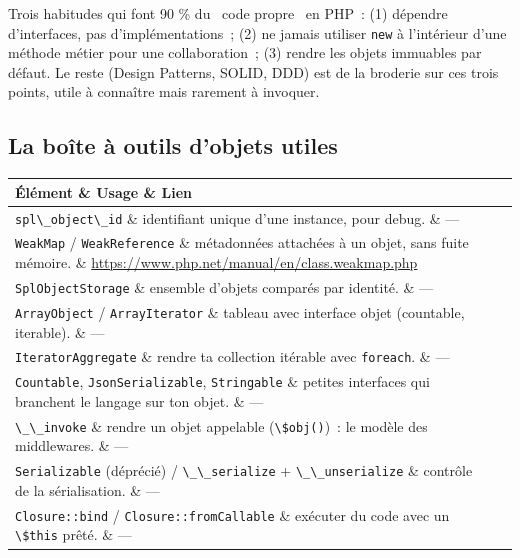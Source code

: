 \documentclass[12pt,a4paper,twoside,openright]{book}
\makeatletter
\newenvironment{tabz}[1]{\rowcolors{2}{white}{tralight}%
  \small\setlength{\tabcolsep}{5pt}\setlength{\LTpre}{3pt}\setlength{\LTpost}{3pt}%
  \begin{longtable}{@{}#1@{}}\toprule}
  {\bottomrule\end{longtable}\normalfont\setlength{\tabcolsep}{6pt}}
\newcommand{\thd}[1]{\textbf{\color{white}#1}}
\newcommand{\headrow}{\rowcolor{theadbg}}
\makeatother
\begin{document}
\begin{astuce}
Trois habitudes qui font 90 \% du \og ~code propre~ \fg{} en PHP~: (1) d\'ependre d'interfaces, pas
d'impl\'ementations~; (2) ne jamais utiliser \verb|new| \`a l'int\'erieur d'une m\'ethode m\'etier pour une
collaboration~; (3) rendre les objets immuables par d\'efaut. Le reste (Design Patterns, SOLID,
DDD) est de la broderie sur ces trois points, utile \`a conna\^itre mais rarement \`a invoquer.
\end{astuce}

\subsection{La bo\^ite \`a outils d'objets utiles}

\begin{tabz}{lXl}
  \headrow \thd{\'El\'ement} \& \thd{Usage} \& \thd{Lien} \\
  \midrule
  \verb|spl\_object\_id| \& identifiant unique d'une instance, pour debug. \& --- \\
  \verb|WeakMap| / \verb|WeakReference| \& m\'etadonn\'ees attach\'ees \`a un objet, sans fuite m\'emoire. \& \url{https://www.php.net/manual/en/class.weakmap.php} \\
  \verb|SplObjectStorage| \& ensemble d'objets compar\'es par identit\'e. \& --- \\
  \verb|ArrayObject| / \verb|ArrayIterator| \& tableau avec interface objet (countable, iterable). \& --- \\
  \verb|IteratorAggregate| \& rendre ta collection it\'erable avec \verb|foreach|. \& --- \\
  \verb|Countable|, \verb|JsonSerializable|, \verb|Stringable| \& petites interfaces qui branchent le langage sur ton objet. \& --- \\
  \verb|\_\_invoke| \& rendre un objet appelable (\verb|\$obj()|)~: le mod\`ele des middlewares. \& --- \\
  \verb|Serializable| (d\'epr\'eci\'e) / \verb|\_\_serialize| + \verb|\_\_unserialize| \& contr\^ole de la s\'erialisation. \& --- \\
  \verb|Closure::bind| / \verb|Closure::fromCallable| \& ex\'ecuter du code avec un \verb|\$this| pr\^et\'e. \& --- \\
\end{tabz}
\end{document}
